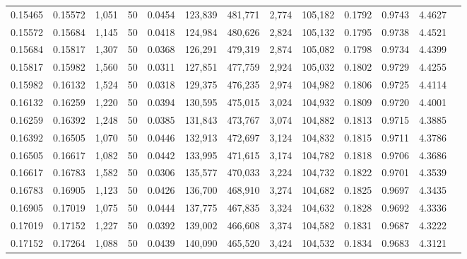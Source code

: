 \begin{tabular}{rrrrrrrrrrrrr}
0.15465 & 0.15572 & 1,051 &  50 &                                     0.0454 & 123,839 & 481,771 &   2,774 & 105,182 & 0.1792 & 0.9743 & 4.4627 \\
0.15572 & 0.15684 & 1,145 &  50 &                                     0.0418 & 124,984 & 480,626 &   2,824 & 105,132 & 0.1795 & 0.9738 & 4.4521 \\
0.15684 & 0.15817 & 1,307 &  50 &                                     0.0368 & 126,291 & 479,319 &   2,874 & 105,082 & 0.1798 & 0.9734 & 4.4399 \\
0.15817 & 0.15982 & 1,560 &  50 &                                     0.0311 & 127,851 & 477,759 &   2,924 & 105,032 & 0.1802 & 0.9729 & 4.4255 \\
0.15982 & 0.16132 & 1,524 &  50 &                                     0.0318 & 129,375 & 476,235 &   2,974 & 104,982 & 0.1806 & 0.9725 & 4.4114 \\
0.16132 & 0.16259 & 1,220 &  50 &                                     0.0394 & 130,595 & 475,015 &   3,024 & 104,932 & 0.1809 & 0.9720 & 4.4001 \\
0.16259 & 0.16392 & 1,248 &  50 &                                     0.0385 & 131,843 & 473,767 &   3,074 & 104,882 & 0.1813 & 0.9715 & 4.3885 \\
0.16392 & 0.16505 & 1,070 &  50 &                                     0.0446 & 132,913 & 472,697 &   3,124 & 104,832 & 0.1815 & 0.9711 & 4.3786 \\
0.16505 & 0.16617 & 1,082 &  50 &                                     0.0442 & 133,995 & 471,615 &   3,174 & 104,782 & 0.1818 & 0.9706 & 4.3686 \\
0.16617 & 0.16783 & 1,582 &  50 &                                     0.0306 & 135,577 & 470,033 &   3,224 & 104,732 & 0.1822 & 0.9701 & 4.3539 \\
0.16783 & 0.16905 & 1,123 &  50 &                                     0.0426 & 136,700 & 468,910 &   3,274 & 104,682 & 0.1825 & 0.9697 & 4.3435 \\
0.16905 & 0.17019 & 1,075 &  50 &                                     0.0444 & 137,775 & 467,835 &   3,324 & 104,632 & 0.1828 & 0.9692 & 4.3336 \\
0.17019 & 0.17152 & 1,227 &  50 &                                     0.0392 & 139,002 & 466,608 &   3,374 & 104,582 & 0.1831 & 0.9687 & 4.3222 \\
0.17152 & 0.17264 & 1,088 &  50 &                                     0.0439 & 140,090 & 465,520 &   3,424 & 104,532 & 0.1834 & 0.9683 & 4.3121 \\

\end{tabular}
